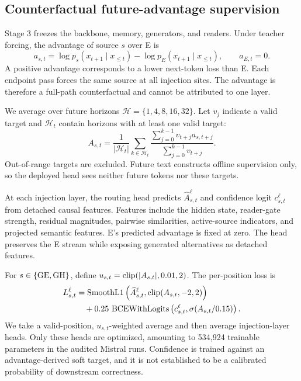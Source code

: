 \subsection{Counterfactual future-advantage supervision}

Stage 3 freezes the backbone, memory, generators, and readers. Under teacher forcing, the advantage of source $s$ over E is
\begin{equation}
 a_{s,t}=\log p_s(x_{t+1}\mid x_{\leq t})
       -\log p_E(x_{t+1}\mid x_{\leq t}),\qquad a_{E,t}=0.
 \label{eq:advantage}
\end{equation}
A positive advantage corresponds to a lower next-token loss than E. Each endpoint pass forces the same source at all injection sites. The advantage is therefore a full-path counterfactual and cannot be attributed to one layer.

We average over future horizons $\mathcal H=\{1,4,8,16,32\}$. Let $v_j$ indicate a valid target and $\mathcal H_t$ contain horizons with at least one valid target:
\begin{equation}
 A_{s,t}=\frac1{|\mathcal H_t|}\sum_{k\in\mathcal H_t}
 \frac{\sum_{j=0}^{k-1}v_{t+j}a_{s,t+j}}
      {\sum_{j=0}^{k-1}v_{t+j}} .
 \label{eq:horizons}
\end{equation}
Out-of-range targets are excluded. Future text constructs offline supervision only, so the deployed head sees neither future tokens nor these targets.

At each injection layer, the routing head predicts $\widehat A_{s,t}^\ell$ and confidence logit $c_{s,t}^\ell$ from detached causal features. Features include the hidden state, reader-gate strength, residual magnitudes, pairwise similarities, active-source indicators, and projected semantic features. E's predicted advantage is fixed at zero. The head preserves the E stream while exposing generated alternatives as detached features.

For $s\in\{\mathrm{GE},\mathrm{GH}\}$, define $u_{s,t}=\operatorname{clip}(|A_{s,t}|,0.01,2)$. The per-position loss is
\begin{align}
 L_{s,t}^{\ell}
 &=\operatorname{SmoothL1}\left(\widehat A_{s,t}^\ell,
                         \operatorname{clip}(A_{s,t},-2,2)\right) \nonumber\\
 &\quad+0.25\,\operatorname{BCEWithLogits}
            \left(c_{s,t}^\ell,\sigma(A_{s,t}/0.15)\right).
 \label{eq:headloss}
\end{align}
We take a valid-position, $u_{s,t}$-weighted average and then average injection-layer heads. Only these heads are optimized, amounting to 534,924 trainable parameters in the audited Mistral runs. Confidence is trained against an advantage-derived soft target, and it is not established to be a calibrated probability of downstream correctness.
